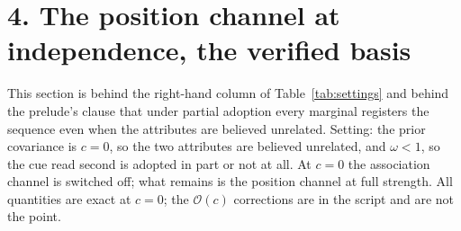 \documentclass[11pt,a4paper]{article}
\newcommand{\bigO}{\mathcal{O}}
\begin{document}
\section*{4. The position channel at independence, the verified basis}

\noindent This section is behind the right-hand column of
Table~\ref{tab:settings} and behind the prelude's clause that under partial
adoption every marginal registers the sequence even when the attributes are
believed unrelated. Setting: the prior covariance is $c=0$, so the two
attributes are believed unrelated, and $\omega<1$, so the cue read second is
adopted in part or not at all. At $c=0$ the association channel is switched
off; what remains is the position channel at full strength. All quantities
are exact at $c=0$; the $\bigO(c)$ corrections are in the script and are not
the point.
\end{document}
